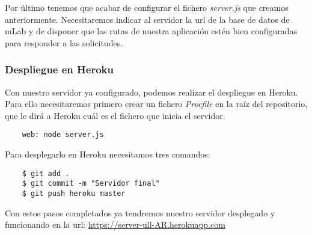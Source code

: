 Por último tenemos que acabar de configurar el fichero \textit{server.js} que creamos anteriormente. Necesitaremos indicar al servidor la url de la base de datos de mLab y de disponer que las rutas de nuestra aplicación estén bien configuradas para responder a las solicitudes. 


\subsubsection{Despliegue en Heroku}

Con nuestro servidor ya configurado, podemos realizar el despliegue en Heroku. Para ello necesitaremos primero crear un fichero \textit{Procfile} en la raíz del repositorio, que le dirá a Heroku cuál es el fichero que inicia el servidor.

\begin{lstlisting}
    web: node server.js
\end{lstlisting}


Para desplegarlo en Heroku necesitamos tres comandos:

\begin{lstlisting}
    $ git add .
    $ git commit -m "Servidor final"
    $ git push heroku master
\end{lstlisting}

Con estos pasos completados ya tendremos nuestro servidor desplegado y funcionando en la url: \href{https://server-ull-AR.herokuapp.com}{https://server-ull-AR.herokuapp.com}




